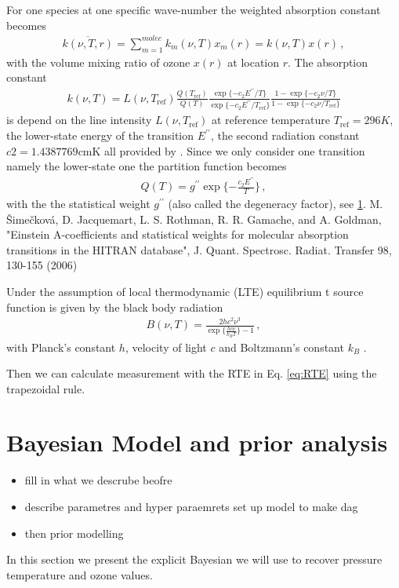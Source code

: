For one species at one specific wave-number the weighted absorption constant becomes
\begin{align}
	\overline{k(\nu, T, r)}    = \sum_{m=1}^{molec} k_m(\nu, T) x_m(r) =  k(\nu, T) x(r) \, ,
\end{align}
with the volume mixing ratio of ozone $x(r)$ at location $r$. 
The absorption constant
\begin{align}
	k(\nu, T) = L(\nu, T_{\text{ref}}) \frac{Q(T_{\text{ref}})}{Q(T)} \frac{ \exp{\{ - c_2 E^{\prime \prime} / T\}} }{\exp{\{ - c_2 E^{\prime \prime} / T_{\text{ref}} \}}} \frac{ 1- \exp{\{ - c_2 \nu  / T \}} }{1 - \exp{\{ - c_2 \nu / T_{\text{ref}} \}}}
\end{align}
is depend on the line intensity $L(\nu, T_{\text{ref}})$ at reference temperature $T_{\text{ref}} =296K $, the lower-state energy of the transition $ E^{\prime \prime} $, the second radiation constant $c2=1.4387769\text{cmK}$ all provided by \cite{}.
Since we only consider one transition namely the lower-state one the partition function becomes
\begin{align}
	Q(T )= g^{\prime \prime} \exp{\{ - \frac{ c_2 E^{\prime \prime} }{T}\}} \, ,
\end{align}
with the the statistical weight $ g^{\prime \prime}$ (also called the degeneracy factor), see \ref{}.
M. Šimečková, D. Jacquemart, L. S. Rothman, R. R. Gamache, and A. Goldman, "Einstein A-coefficients and statistical weights for molecular absorption transitions in the HITRAN database", J. Quant. Spectrosc. Radiat. Transfer 98, 130-155 (2006)

Under the assumption of local thermodynamic (LTE) equilibrium t source function is given by the black body radiation
\begin{align}
	B(\nu,T)   = \frac{2 h c^2 \nu^3}{\exp{\{\frac{hc\nu}{k_B T}\}}-1}\, ,
\end{align}
with Planck's constant $h$, velocity of light $c$ and Boltzmann's constant $k_B$ \cite{}.

Then we can calculate measurement with the RTE in Eq. \ref{eq:RTE} using the trapezoidal rule.



\section{Bayesian Model and prior analysis}
\begin{itemize}
	\item fill in what we descrube beofre 
	\item describe parametres and hyper paraemrets set up model to make dag
	\item then prior modelling
\end{itemize}
In this section we present the explicit Bayesian we will use to recover pressure temperature and ozone values.

